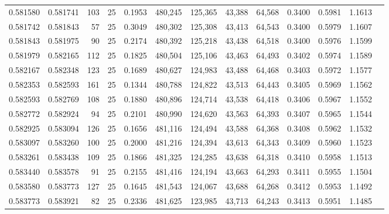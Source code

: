 \begin{tabular}{rrrrrrrrrrrrr}
0.581580 & 0.581741 &   103 &  25 &                                     0.1953 & 480,245 & 125,365 &  43,388 &  64,568 & 0.3400 & 0.5981 & 1.1613 \\
0.581742 & 0.581843 &    57 &  25 &                                     0.3049 & 480,302 & 125,308 &  43,413 &  64,543 & 0.3400 & 0.5979 & 1.1607 \\
0.581843 & 0.581975 &    90 &  25 &                                     0.2174 & 480,392 & 125,218 &  43,438 &  64,518 & 0.3400 & 0.5976 & 1.1599 \\
0.581979 & 0.582165 &   112 &  25 &                                     0.1825 & 480,504 & 125,106 &  43,463 &  64,493 & 0.3402 & 0.5974 & 1.1589 \\
0.582167 & 0.582348 &   123 &  25 &                                     0.1689 & 480,627 & 124,983 &  43,488 &  64,468 & 0.3403 & 0.5972 & 1.1577 \\
0.582353 & 0.582593 &   161 &  25 &                                     0.1344 & 480,788 & 124,822 &  43,513 &  64,443 & 0.3405 & 0.5969 & 1.1562 \\
0.582593 & 0.582769 &   108 &  25 &                                     0.1880 & 480,896 & 124,714 &  43,538 &  64,418 & 0.3406 & 0.5967 & 1.1552 \\
0.582772 & 0.582924 &    94 &  25 &                                     0.2101 & 480,990 & 124,620 &  43,563 &  64,393 & 0.3407 & 0.5965 & 1.1544 \\
0.582925 & 0.583094 &   126 &  25 &                                     0.1656 & 481,116 & 124,494 &  43,588 &  64,368 & 0.3408 & 0.5962 & 1.1532 \\
0.583097 & 0.583260 &   100 &  25 &                                     0.2000 & 481,216 & 124,394 &  43,613 &  64,343 & 0.3409 & 0.5960 & 1.1523 \\
0.583261 & 0.583438 &   109 &  25 &                                     0.1866 & 481,325 & 124,285 &  43,638 &  64,318 & 0.3410 & 0.5958 & 1.1513 \\
0.583440 & 0.583578 &    91 &  25 &                                     0.2155 & 481,416 & 124,194 &  43,663 &  64,293 & 0.3411 & 0.5955 & 1.1504 \\
0.583580 & 0.583773 &   127 &  25 &                                     0.1645 & 481,543 & 124,067 &  43,688 &  64,268 & 0.3412 & 0.5953 & 1.1492 \\
0.583773 & 0.583921 &    82 &  25 &                                     0.2336 & 481,625 & 123,985 &  43,713 &  64,243 & 0.3413 & 0.5951 & 1.1485 \\

\end{tabular}
